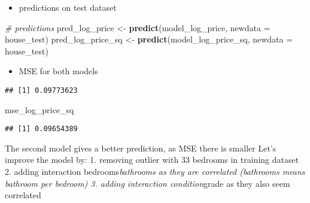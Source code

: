 \documentclass[
]{article}
\newenvironment{Shaded}{\begin{snugshade}}{\end{snugshade}}
\newcommand{\AttributeTok}[1]{\textcolor[rgb]{0.13,0.29,0.53}{#1}}
\newcommand{\CommentTok}[1]{\textcolor[rgb]{0.56,0.35,0.01}{\textit{#1}}}
\newcommand{\DecValTok}[1]{\textcolor[rgb]{0.00,0.00,0.81}{#1}}
\newcommand{\FunctionTok}[1]{\textcolor[rgb]{0.13,0.29,0.53}{\textbf{#1}}}
\newcommand{\NormalTok}[1]{#1}
\newcommand{\OtherTok}[1]{\textcolor[rgb]{0.56,0.35,0.01}{#1}}
\newcommand{\SpecialCharTok}[1]{\textcolor[rgb]{0.81,0.36,0.00}{\textbf{#1}}}
\providecommand{\tightlist}{%
  \setlength{\itemsep}{0pt}\setlength{\parskip}{0pt}}
\begin{document}
\begin{itemize}
\tightlist
\item
  predictions on test dataset
\end{itemize}

\begin{Shaded}
\begin{Highlighting}[]
\CommentTok{\# predictions}
\NormalTok{pred\_log\_price }\OtherTok{\textless{}{-}} \FunctionTok{predict}\NormalTok{(model\_log\_price, }\AttributeTok{newdata =}\NormalTok{ house\_test)}
\NormalTok{pred\_log\_price\_sq }\OtherTok{\textless{}{-}} \FunctionTok{predict}\NormalTok{(model\_log\_price\_sq, }\AttributeTok{newdata =}\NormalTok{ house\_test)}
\end{Highlighting}
\end{Shaded}

\begin{itemize}
\tightlist
\item
  MSE for both models
\end{itemize}

\begin{Shaded}
\end{Shaded}

\begin{verbatim}
## [1] 0.09773623
\end{verbatim}

\begin{Shaded}
\begin{Highlighting}[]
\NormalTok{mse\_log\_price\_sq}
\end{Highlighting}
\end{Shaded}

\begin{verbatim}
## [1] 0.09654389
\end{verbatim}

The second model gives a better prediction, as MSE there is smaller
Let's improve the model by: 1. removing outlier with 33 bedrooms in
training dataset 2. adding interaction bedrooms\emph{bathrooms as they
are correlated (bathrooms means bathroom per bedroom) 3. adding
interaction condition}grade as they also seem correlated
\end{document}
